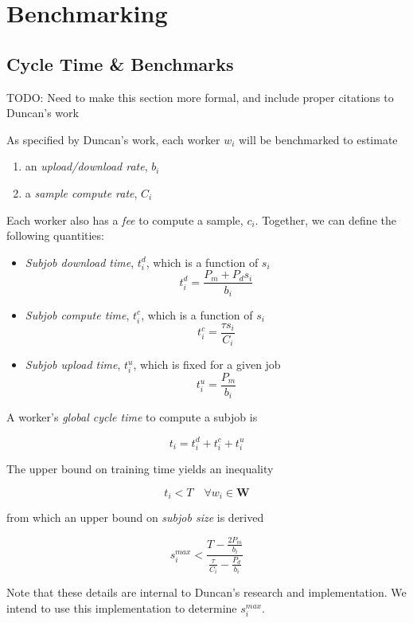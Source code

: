 \documentclass[../mthe-493-final-project.tex]{subfiles}
\begin{document}
    \chapter{Benchmarking}
    \label{ch:benchmarking}
    
    \section{Cycle Time \& Benchmarks}
    
    TODO: Need to make this section more formal, and include proper citations to Duncan's work
    
    As specified by Duncan's work, each worker $w_i$ will be benchmarked to estimate
    
    \begin{enumerate}
        \item an \textit{upload/download rate}, $b_i$
        \item a \textit{sample compute rate}, $C_i$
    \end{enumerate}
    
    Each worker also has a \textit{fee} to compute a sample, $c_i$. Together, we can define the following quantities:
    
    \begin{itemize}
        \item \textit{Subjob download time}, $t^d_i$, which is a function of $s_i$
            \[t^d_i = \frac{P_m + P_d s_i}{b_i}\]
        \item \textit{Subjob compute time}, $t^c_i$, which is a function of $s_i$
            \[t^c_i = \frac{\tau s_i}{C_i}\]
        \item \textit{Subjob upload time}, $t^u_i$, which is fixed for a given job
            \[t^u_i = \frac{P_m}{b_i}\]
    \end{itemize}
    
    A worker's \textit{global cycle time} to compute a subjob is
    
    \[t_i = t^d_i + t^c_i + t^u_i\]
    
    The upper bound on training time yields an inequality
    
    \[t_i < T \quad \forall w_i \in \mathbf{W}\]
    
    from which an upper bound on \textit{subjob size} is derived
    
    \[s^{max}_i < \frac{T - \frac{2 P_m}{b_i}}{\frac{\tau}{C_i} - \frac{P_d}{b_i}}\]
    
    Note that these details are internal to Duncan's research and implementation. We intend to use this implementation to determine $s^{max}_i$.

    
\end{document}
